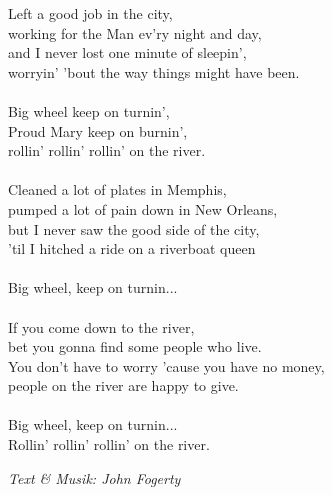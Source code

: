 \vspace{10pt}
Left a good job in the city,\\
working for the Man ev'ry night and day,\\
and I never lost one minute of sleepin',\\
worryin' 'bout the way things might have been.\\
\\
Big wheel keep on turnin',\\
Proud Mary keep on burnin',\\
rollin' rollin' rollin' on the river.\\
\\
Cleaned a lot of plates in Memphis,\\
pumped a lot of pain down in New Orleans,\\
but I never saw the good side of the city,\\
'til I hitched a ride on a riverboat queen\\
\\
Big wheel, keep on turnin...\\
\\
If you come down to the river,\\
bet you gonna find some people who live.\\
You don't have to worry 'cause you have no money,\\
people on the river are happy to give.\\
\\
Big wheel, keep on turnin...\\
Rollin' rollin' rollin' on the river.
\par
\vspace{10pt}
{\footnotesize\textit{Text \& Musik: John Fogerty}}
